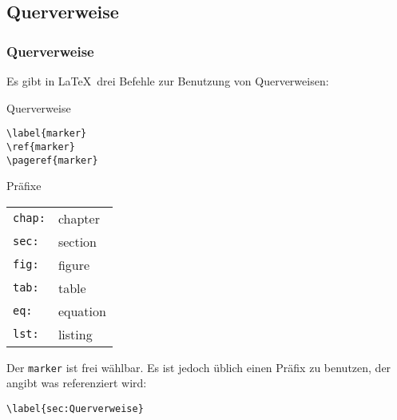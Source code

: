 \subsection{Querverweise}\label{sec:querverweise}

\begin{frame}[c,fragile]
\frametitle{Querverweise}

Es gibt in \LaTeX\ drei Befehle zur Benutzung von Querverweisen:

\begin{minipage}{0.45\textwidth}
\begin{block}{Querverweise}
\begin{verbatim}
\label{marker}
\ref{marker}
\pageref{marker}
\end{verbatim}
\end{block}
\end{minipage}
\hfill
\begin{minipage}{0.45\textwidth}
\begin{block}{Pr\"afixe}
\begin{tabular}{ll}
\texttt{chap:} & chapter \\
\texttt{sec:} & section \\
\texttt{fig:} & figure \\
\texttt{tab:} & table \\
\texttt{eq:} & equation \\
\texttt{lst:} & listing
\end{tabular}
\end{block}
\end{minipage}

Der \texttt{marker} ist frei w\"ahlbar. Es ist jedoch \"ublich einen Präfix zu benutzen, der angibt was referenziert wird:

\verb|\label{sec:Querverweise}|

\end{frame}

